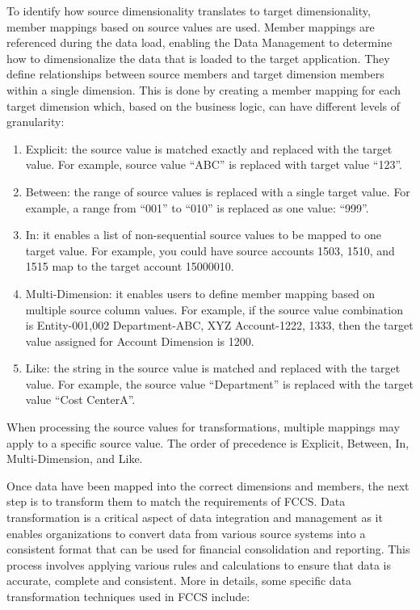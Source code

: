 \documentclass[12pt,a4paper,openright,twoside]{book}
\begin{document}
To identify how source dimensionality translates to target dimensionality, member mappings based on source values are used. 
%
Member mappings are referenced during the data load, enabling the Data Management to determine how to dimensionalize the data that is loaded to the target application. 
%
They define relationships between source members and target dimension members within a single dimension. 
%
This is done by creating a member mapping for each target dimension which, based on the business logic, can have different levels of granularity:

\begin{enumerate}
    \item Explicit: the source value is matched exactly and replaced with the target value. For example, source value ``ABC'' is replaced with target value ``123''.
    \item Between: the range of source values is replaced with a single target value. For example, a range from ``001'' to ``010'' is replaced as one value: ``999''. 
    \item In: it enables a list of non-sequential source values to be mapped to one target value. For example, you could have source accounts 1503, 1510, and 1515 map to the target account 15000010.
    \item Multi-Dimension: it enables users to define member mapping based on multiple source column values. For example, if the source value combination is Entity-001,002 Department-ABC, XYZ Account-1222, 1333, then the target value assigned for Account Dimension is 1200.
    \item Like: the string in the source value is matched and replaced with the target value.  For example, the source value ``Department'' is replaced with the target value ``Cost CenterA''.
\end{enumerate}

When processing the source values for transformations, multiple mappings may apply to a specific source value. 
%
The order of precedence is Explicit, Between, In, Multi-Dimension, and Like. 

Once data have been mapped into the correct dimensions and members, the next step is to transform them to match the requirements of FCCS. 
%
Data transformation is a critical aspect of data integration and management as it enables organizations to convert data from various source systems into a consistent format that can be used for financial consolidation and reporting.
%
This process involves applying various rules and calculations to ensure that data is accurate, complete and consistent.
%
More in details, some specific data transformation techniques used in FCCS include:
\end{document}
